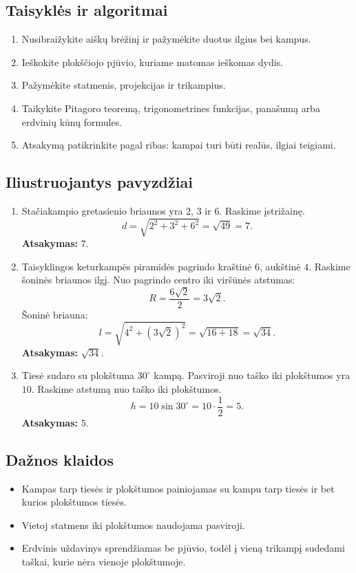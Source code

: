 \subsection{Taisyklės ir algoritmai}
\begin{enumerate}[label=\arabic*.]
\item Nusibraižykite aiškų brėžinį ir pažymėkite duotus ilgius bei kampus.
\item Ieškokite plokščiojo pjūvio, kuriame matomas ieškomas dydis.
\item Pažymėkite statmenis, projekcijas ir trikampius.
\item Taikykite Pitagoro teoremą, trigonometrines funkcijas, panašumą arba erdvinių kūnų formules.
\item Atsakymą patikrinkite pagal ribas: kampai turi būti realūs, ilgiai teigiami.
\end{enumerate}

\subsection{Iliustruojantys pavyzdžiai}
\begin{enumerate}[label=\arabic*.]
\item Stačiakampio gretasienio briaunos yra \(2\), \(3\) ir \(6\). Raskime įstrižainę.
\[
d=\sqrt{2^2+3^2+6^2}=\sqrt{49}=7.
\]
\textbf{Atsakymas:} \(7\).

\item Taisyklingos keturkampės piramidės pagrindo kraštinė \(6\), aukštinė \(4\). Raskime šoninės briaunos ilgį.
Nuo pagrindo centro iki viršūnės atstumas:
\[
R=\frac{6\sqrt2}{2}=3\sqrt2.
\]
Šoninė briauna:
\[
l=\sqrt{4^2+(3\sqrt2)^2}=\sqrt{16+18}=\sqrt{34}.
\]
\textbf{Atsakymas:} \(\sqrt{34}\).

\item Tiesė sudaro su plokštuma \(30^\circ\) kampą. Pasviroji nuo taško iki plokštumos yra \(10\). Raskime atstumą nuo taško iki plokštumos.
\[
h=10\sin30^\circ=10\cdot\frac12=5.
\]
\textbf{Atsakymas:} \(5\).
\end{enumerate}

\subsection{Dažnos klaidos}
\begin{itemize}
\item Kampas tarp tiesės ir plokštumos painiojamas su kampu tarp tiesės ir bet kurios plokštumos tiesės.
\item Vietoj statmens iki plokštumos naudojama pasviroji.
\item Erdvinis uždavinys sprendžiamas be pjūvio, todėl į vieną trikampį sudedami taškai, kurie nėra vienoje plokštumoje.
\end{itemize}


